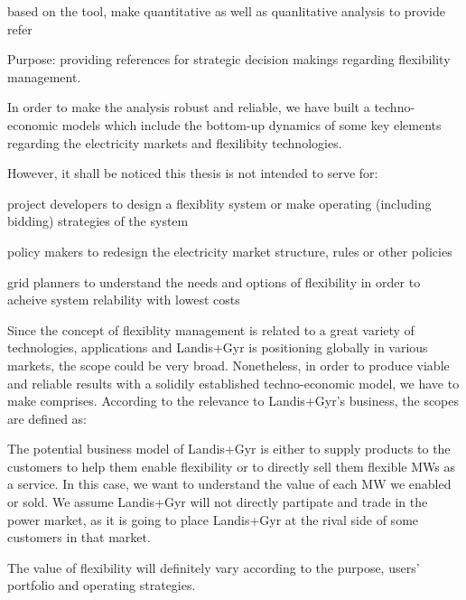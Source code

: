 based on the tool, make quantitative as well as quanlitative analysis to provide refer 

Purpose: providing references for strategic decision makings regarding flexibility management.

In order to make the analysis robust and reliable, we have built a techno-economic models which include the bottom-up dynamics of some key elements regarding the electricity markets and flexilibity technologies. 

However, it shall be noticed this thesis is not intended to serve for:

project developers to design a flexiblity system or make operating (including bidding) strategies of the system

policy makers to redesign the electricity market structure, rules or other policies

grid planners to understand the needs and options of flexibility in order to acheive system relability with lowest costs


Since the concept of flexiblity management is related to a great variety of technologies, applications and Landis+Gyr is positioning globally in various markets, the scope could be very broad. Nonetheless, in order to produce viable and reliable results with a solidily established techno-economic model, we have to make comprises. According to the relevance to Landis+Gyr's business, the scopes are defined as:



The potential business model of Landis+Gyr is either to supply products to the customers to help them enable flexibility or to directly sell them flexible MWs as a service. In this case, we want to understand the value of each MW we enabled or sold. We assume Landis+Gyr will not directly partipate and trade in the power market, as it is going to place Landis+Gyr at the rival side of some customers in that market.

The value of flexibility will definitely vary according to the purpose, users' portfolio and operating strategies. 


